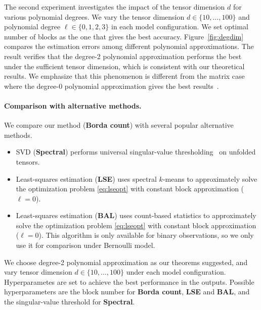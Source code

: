 \documentclass[12pt]{article}
\theoremstyle{definition}
\begin{document}
 

The second experiment investigates the impact of the tensor dimension $d$ for various polynomial degrees. We vary the tensor dimension $d\in\{10,\ldots,100\}$ and polynomial degree $\ell\in\{0,1,2,3\}$ in each model configuration. We set optimal number of blocks as the one that gives the best accuracy. Figure~\ref{fig:degdim} compares the estimation errors among different polynomial approximations. The result verifies that the degree-2 polynomial approximation performs the best under the sufficient tensor dimension, which is consistent with our theoretical results. We emphasize that this phenomenon is different from the matrix case where the degree-0 polynomial approximation gives the best results~\citep{gao2015rate,klopp2017oracle}.


\paragraph{Comparison with alternative methods.} We compare our method ({\bf \small Borda count}) with several popular alternative methods. 
\begin{itemize}[wide, labelwidth=0pt, labelindent=0pt,topsep=0pt,itemsep=-1ex]
     \item SVD ({\bf \small Spectral}) \cite{xu2018rates} performs universal singular-value thresholding~\citep{chatterjee2015matrix} on unfolded tensors.
     \item Least-squares estimation ({\bf \small LSE}) \citep{han2022exact} uses spectral $k$-means to approximately solve the optimization problem \eqref{eq:lseopt} with constant block approximation ($\ell=0$). 
     \item Least-squares estimation ({\bf \small BAL}) \citep{balasubramanian2021nonparametric} uses count-based statistics to approximately solve the optimization problem \eqref{eq:lseopt} with constant block approximation ($\ell=0$). This algorithm is only available for binary observations, so we only use it for comparison under Bernoulli model.
 \end{itemize}
 
 We choose degree-2 polynomial approximation as our theorems suggested, and vary tensor dimension $d\in\{10,\ldots,100\}$ under each model configuration. Hyperparametes are set to achieve the best performance in the outputs. Possible hyperparameters are the block number for {\bf \small Borda count}, {\bf \small LSE} and {\bf \small BAL}, and the singular-value threshold for {\bf \small Spectral}. 
 
\end{document}
